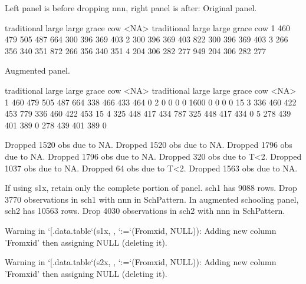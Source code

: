Left panel is before dropping \textsf{nnn}, right panel is after: Original panel.
\begin{Schunk}
\begin{Soutput}
  traditional large large grace cow <NA> traditional large large grace cow
1         460   479         505 487  664         300   396         369 403
2         300   396         369 403  822         300   396         369 403
3         266   356         340 351  872         266   356         340 351
4         204   306         282 277  949         204   306         282 277
\end{Soutput}
\end{Schunk}
Augmented panel.
\begin{Schunk}
\begin{Soutput}
  traditional large large grace cow <NA> traditional large large grace cow <NA>
1         460   479         505 487  664         338   466         433 464    0
2           0     0           0   0 1600           0     0           0   0   15
3         336   460         422 453  779         336   460         422 453   15
4         325   448         417 434  787         325   448         417 434    0
5         278   439         401 389    0         278   439         401 389    0
\end{Soutput}
\end{Schunk}
\begin{Schunk}
\begin{Soutput}
Dropped 1520 obs due to NA.
Dropped 1520 obs due to NA.
Dropped 1796 obs due to NA.
Dropped 1796 obs due to NA.
Dropped 320 obs due to T<2.
Dropped 1037 obs due to NA.
Dropped 64 obs due to T<2.
Dropped 1563 obs due to NA.
\end{Soutput}
\end{Schunk}
If using \textsf{s1x}, retain only the complete portion of panel. \textsf{sch1} has 9088 rows. Drop 3770 observations in \textsf{sch1} with nnn in \textsf{SchPattern}. In augmented schooling panel, \textsf{sch2} has 10563 rows. Drop 4030 observations in \textsf{sch2} with nnn in \textsf{SchPattern}.
\begin{Schunk}
\begin{Soutput}
Warning in `[.data.table`(s1x, , `:=`(Fromxid, NULL)): Adding new column 'Fromxid' then assigning NULL (deleting it).
\end{Soutput}
\begin{Soutput}
Warning in `[.data.table`(s2x, , `:=`(Fromxid, NULL)): Adding new column 'Fromxid' then assigning NULL (deleting it).
\end{Soutput}
\end{Schunk}
